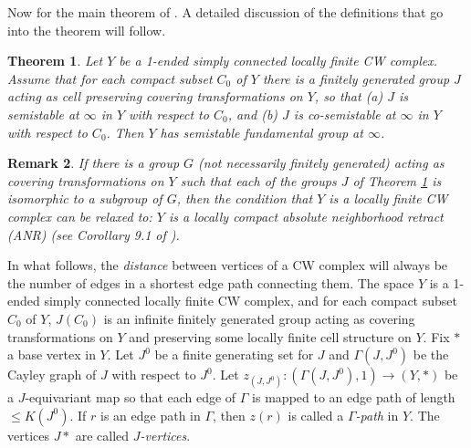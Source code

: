 \documentclass[12pt]{article}
\newtheorem{theorem}{Theorem}[subsection]
\newtheorem{remark}[theorem]{Remark}
\begin{document}
Now for the main theorem of \cite{GGM1}.
A detailed discussion of the definitions that
go into the theorem will follow. 

\begin{theorem}\label{MTGGM}
Let $Y$ be a 1-ended simply connected locally finite
CW complex. Assume that for each compact subset $C_{0}$ of $Y$ there is a
finitely generated group $J$ acting as cell preserving covering
transformations on $Y$, so that (a) $J$ is semistable at $\infty$ in $Y$ with
respect to $C_{0}$, and (b) $J$ is co-semistable at $\infty$ in $Y$ with
respect to $C_{0}$. Then $Y$ has semistable fundamental group at $\infty$.
\end{theorem}

\begin{remark}
If there is a group $G$ (not necessarily finitely generated) acting as
covering transformations on $Y$ such that each of the groups $J$ of Theorem
\ref{MTGGM} is isomorphic to a subgroup of $G$, then the condition that $Y$ is a
locally finite CW complex can be relaxed to: $Y$ is a locally compact absolute
neighborhood retract (ANR) (see Corollary 9.1 of \cite{GGM1}).
\end{remark}

In what follows, the {\it distance} between vertices of a CW complex will always
be the number of edges in a shortest edge path connecting them. The space $Y$
is a 1-ended simply connected locally finite CW complex, and for each compact
subset $C_{0}$ of $Y$, $J(C_{0})$ is an infinite finitely generated group
acting as covering transformations on $Y$ and preserving some locally finite
cell structure on $Y$. Fix $\ast$ a base vertex in $Y$. Let $J^{0}$ be a
finite generating set for $J$ and $\Gamma(J,J^{0})$ be the Cayley graph of
$J$ with respect to $J^{0}$. Let $z_{(J,J^{0})}:(\Gamma(J,J^{0}
),1)\rightarrow(Y,\ast)$ be a $J$-equivariant map so that each edge of
$\Gamma$ is mapped to an edge path of length $\leq K(J^{0})$. If $r$ is an
edge path in $\Gamma$, then $z(r)$ is called a $\Gamma${\it -path} in
$Y$. The vertices $J\ast$ are called $J${\it -vertices}.
\end{document}
